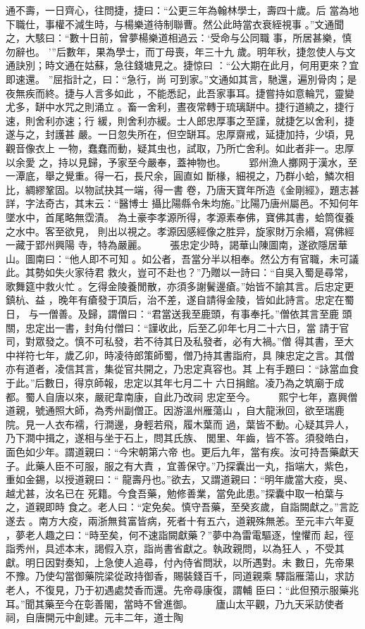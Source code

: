 \documentclass{ctexart}
\begin{document}
通不壽，一日齊心，往問捷，捷曰：``公更三年為翰林學士，壽四十歲。后 當為地下職仕，事權不減生時，与楊樂道待制聯曹。然公此時當衣衰絰視事 。''文通聞之，大駭曰：``數十日前，曾夢楊樂道相過云：`受命与公同職 事，所居甚樂，慎勿辭也。 '''后數年，果為學士，而丁母喪，年三十九 歲。明年秋，捷忽使人与文通訣別；時文通在姑蘇，急往錢塘見之。捷惊曰 ：``公大期在此月，何用更來？宜即速還。 ''屈指計之，曰：``急行，尚 可到家。''文通如其言，馳還，遍別骨肉；是夜無疾而終。捷与人言多如此 ，不能悉記，此吾家事耳。捷嘗持如意輪咒，靈變尤多，缾中水咒之則涌立 。畜一舍利，晝夜常轉于琉璃缾中。捷行道繞之，捷行速，則舍利亦速；行 緩，則舍利亦緩。士人郎忠厚事之至謹，就捷乞以舍利，捷遂与之，封護甚 嚴。一日忽失所在，但空缾耳。忠厚齋戒，延捷加持，少頃，見觀音像衣上 一物，蠢蠢而動，疑其虫也，試取，乃所亡舍利。如此者非一。忠厚以余愛 之，持以見歸，予家至今嚴奉，蓋神物也。 　　郢州漁人擲网于漢水，至一潭底，舉之覺重。得一石，長尺余，圓直如 斷椽，細視之，乃群小蛤，鱗次相比，綢繆鞏固。以物試抉其一端，得一書 卷，乃唐天寶年所造《金剛經》，題志甚詳，字法奇古，其末云：``醫博士 攝比陽縣令朱均施。''比陽乃唐州屬邑。不知何年墜水中，首尾略無霑漬。 為土豪李孝源所得，孝源素奉佛，寶佛其書，蛤筒復養之水中。客至欲見， 則出以視之。孝源因感經像之胜异，旋家財万余緡，寫佛經一藏于郢州興陽 寺，特為嚴麗。 　　張忠定少時，謁華山陳圖南，遂欲隱居華山。圖南曰：``他人即不可知 。如公者，吾當分半以相奉。然公方有官職，未可議此。其勢如失火家待君 救火，豈可不赴也？''乃贈以一詩曰：``自吳入蜀是尋常，歌舞筵中救火忙 。乞得金陵養閒散，亦須多謝鬢邊瘡。''始皆不諭其言。后忠定更鎮杭、益 ，晚年有瘡發于頂后，治不差，遂自請得金陵，皆如此詩言。忠定在蜀日， 与一僧善。及歸，謂僧曰：``君當送我至鹿頭，有事奉托。''僧依其言至鹿 頭關，忠定出一書，封角付僧曰：``謹收此，后至乙卯年七月二十六日，當 請于官司，對眾發之。慎不可私發，若不待其日及私發者，必有大禍。''僧 得其書，至大中祥符七年，歲乙卯，時凌待郎策師蜀，僧乃持其書詣府，具 陳忠定之言。其僧亦有道者，凌信其言，集從官共開之，乃忠定真容也。其 上有手題曰：``詠當血食于此。''后數日，得京師報，忠定以其年七月二十 六日捐館。凌乃為之筑廟于成都。蜀人自唐以來，嚴祀韋南康，自此乃改祠 忠定至今。 　　熙宁七年，嘉興僧道親，號通照大師，為秀州副僧正。因游溫州雁蕩山 ，自大龍湫回，欲至瑞鹿院。見一人衣布襦，行澗邊，身輕若飛，履木葉而 過，葉皆不動。心疑其异人，乃下澗中揖之，遂相与坐于石上，問其氏族、 閭里、年齒，皆不答。須發皓白，面色如少年。謂道親曰：``今宋朝第六帝 也。更后九年，當有疾。汝可持吾藥獻天子。此藥人臣不可服，服之有大責 ，宜善保守。''乃探囊出一丸，指端大，紫色，重如金錫，以授道親曰：`` 龍壽丹也。''欲去，又謂道親曰：``明年歲當大疫，吳、越尤甚，汝名已在 死籍。今食吾藥，勉修善業，當免此患。''探囊中取一柏葉与之，道親即時 食之。老人曰：``定免矣。慎守吾藥，至癸亥歲，自詣闕獻之。''言訖遂去 。南方大疫，兩浙無貧富皆病，死者十有五六，道親殊無恙。至元丰六年夏 ，夢老人趣之曰：``時至矣，何不速詣闕獻藥？''夢中為雷電驅逐，惶懼而 起，徑詣秀州，具述本末，謁假入京，詣尚書省獻之。執政親問，以為狂人 ，不受其獻。明日因對奏知，上急使人追尋，付內侍省問狀，以所遇對。未 數日，先帝果不豫。乃使勾當御藥院梁從政持御香，賜裝錢百千，同道親乘 驛詣雁蕩山，求訪老人，不復見，乃于初遇處焚香而還。先帝尋康復，謂輔 臣曰：``此但預示服藥兆耳。''聞其藥至今在彰善閣，當時不曾進御。 　　廬山太平觀，乃九天采訪使者祠，自唐開元中創建。元丰二年，道士陶 
\end{document}
